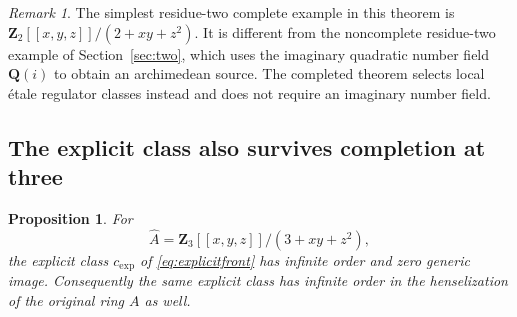 \documentclass[11pt,a4paper]{article}
\newtheorem{proposition}[theorem]{Proposition}
\theoremstyle{remark}
\newtheorem{remark}[theorem]{Remark}
\newcommand{\Q}{\mathbf Q}
\newcommand{\Z}{\mathbf Z}
\begin{document}
\begin{remark}
The simplest residue-two complete example in this theorem is $\Z_2[[x,y,z]]/(2+xy+z^2)$. It is different from the noncomplete residue-two example of Section~\ref{sec:two}, which uses the imaginary quadratic number field $\Q(i)$ to obtain an archimedean source. The completed theorem selects local \'etale regulator classes instead and does not require an imaginary number field.
\end{remark}

\subsection{The explicit class also survives completion at three}\label{sec:explicitcomplete}

\begin{proposition}\label{prop:explicitcomplete}
For
\[
\widehat A=\Z_3[[x,y,z]]/(3+xy+z^2),
\]
the explicit class $c_{\mathrm{exp}}$ of \eqref{eq:explicitfront} has infinite order and zero generic image. Consequently the same explicit class has infinite order in the henselization of the original ring $A$ as well.
\end{proposition}
\end{document}
